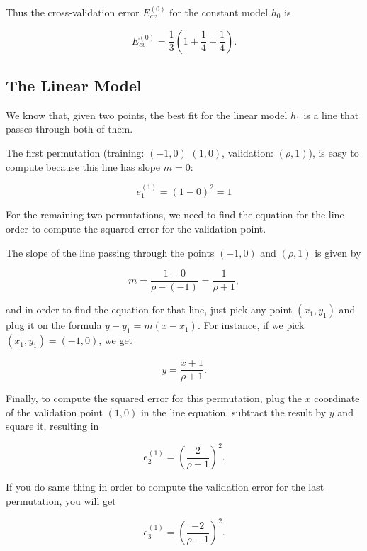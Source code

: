 \documentclass{article}
\begin{document}
Thus the cross-validation error $E_{cv}^{(0)}$ for the constant model $h_0$ is

\begin{equation*}
E_{cv}^{(0)} = \frac{1}{3} \left( 1 + \frac{1}{4} + \frac{1}{4} \right).
\end{equation*}

\subsection{The Linear Model}

We know that, given two points, the best fit for the linear model $h_1$ is a
line that passes through both of them.

The first permutation (training: $(-1,0)$ $(1,0)$, validation: $(\rho,1)$), is
easy to compute because this line has slope $m=0$:

\begin{equation*}
e_1^{(1)} = (1 - 0)^2 = 1
\end{equation*}

For the remaining two permutations, we need to find the equation for the line
order to compute the squared error for the validation point.

The slope of the line passing through the points $(-1,0)$ and $(\rho,1)$ is
given by

\begin{equation*}
m = \frac{1-0}{\rho-(-1)} = \frac{1}{\rho+1},
\end{equation*}

and in order to find the equation for that line, just pick any point $(x_1,y_1)$
and plug it on the formula $y-y_1 = m(x-x_1)$. For instance, if we pick
$(x_1,y_1)=(-1,0)$, we get

\begin{equation*}
y = \frac{x+1}{\rho+1}.
\end{equation*}

Finally, to compute the squared error for this permutation, plug the $x$
coordinate of the validation point $(1,0)$ in the line equation, subtract the
result by $y$ and square it, resulting in

\begin{equation*}
e_2^{(1)} = \left( \frac{2}{\rho+1} \right)^2.
\end{equation*}

If you do same thing in order to compute the validation error for the last
permutation, you will get

\begin{equation*}
e_3^{(1)} = \left( \frac{-2}{\rho-1} \right)^2.
\end{equation*}
\end{document}
